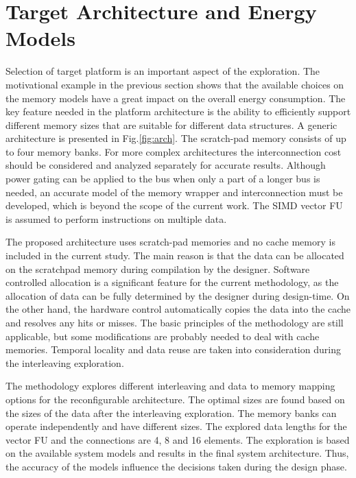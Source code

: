 \documentclass[prodmode,acmtecs]{acmsmall}
\begin{document}
\section{Target Architecture and Energy Models}
\label{sec:platform}

Selection of target platform is an important aspect of the exploration.
The motivational example in the previous section shows that the available choices on the memory models have a great impact on the overall energy consumption.
 The key feature needed in the platform architecture is the ability to efficiently support different memory sizes that are suitable for different data structures.
A generic architecture is presented in Fig.\ref{fig:arch}.
The scratch-pad memory consists of up to four memory banks. 
For more complex architectures the interconnection cost should be considered and analyzed separately for accurate results. 
Although power gating can be applied to the bus when only a part of a longer bus is needed, an accurate model of the memory wrapper and interconnection must be developed, which is beyond the scope of the current work.
The SIMD vector FU is assumed to perform instructions on multiple data.

The proposed architecture uses scratch-pad memories and no cache memory is included in the current study.
The main reason is that the data can be allocated on the scratchpad memory during compilation by the designer.
Software controlled allocation is a significant feature for the current methodology, as the allocation of data can be fully determined by the designer during design-time.
On the other hand, the hardware control automatically copies the data into the cache and resolves any hits or misses.
The basic principles of the methodology are still applicable, but some modifications are probably needed to deal with cache memories.
Temporal locality and data reuse are taken into consideration during the interleaving exploration.

The methodology explores different interleaving and data to memory mapping options for the reconfigurable architecture.
The optimal sizes are found based on the sizes of the data after the interleaving exploration.
The memory banks can operate independently and have different sizes.
The explored data lengths for the vector FU and the connections are 4, 8 and 16 elements.
The exploration is based on the available system models and results in the final system architecture.
Thus, the accuracy of the models influence the decisions taken during the design phase.
\end{document}

